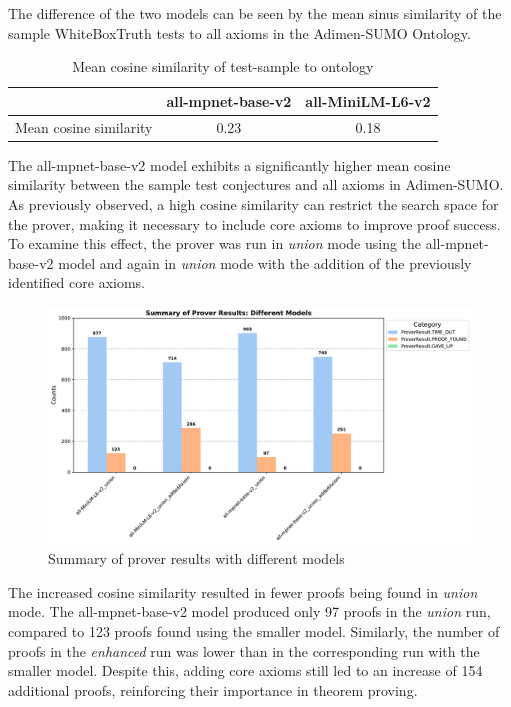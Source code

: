\documentclass[english,version-2020-11]{uzl-thesis}
\begin{document}
The difference of the two models can be seen by the mean sinus similarity of the sample WhiteBoxTruth tests to all axioms in the Adimen-SUMO Ontology.


\begin{table}[h]
    \centering
    \begin{tabular}{lcc}
        \hline
        & \textbf{all-mpnet-base-v2} & \textbf{all-MiniLM-L6-v2} \\
        \hline
        Mean cosine similarity & 0.23 & 0.18 \\
        \hline
    \end{tabular}
    \caption{Mean cosine similarity of test-sample to ontology}
    \label{tab:model_comparison_2}
\end{table}

The all-mpnet-base-v2 model exhibits a significantly higher mean cosine similarity between the sample test conjectures and all axioms in Adimen-SUMO. As previously observed, a high cosine similarity can restrict the search space for the prover, making it necessary to include core axioms to improve proof success. To examine this effect, the prover was run in \textit{union} mode using the all-mpnet-base-v2 model and again in \textit{union} mode with the addition of the previously identified core axioms.

\begin{figure}[h!]
    \centering
    \includegraphics[width=\textwidth]{different_mode_output.pdf}
    \caption{Summary of prover results with different models}
    \label{fig:results_different_models}
\end{figure}        
\FloatBarrier

The increased cosine similarity resulted in fewer proofs being found in \textit{union} mode. The all-mpnet-base-v2 model produced only 97 proofs in the \textit{union} run, compared to 123 proofs found using the smaller model. Similarly, the number of proofs in the \textit{enhanced} run was lower than in the corresponding run with the smaller model. Despite this, adding core axioms still led to an increase of 154 additional proofs, reinforcing their importance in theorem proving.
\end{document}
